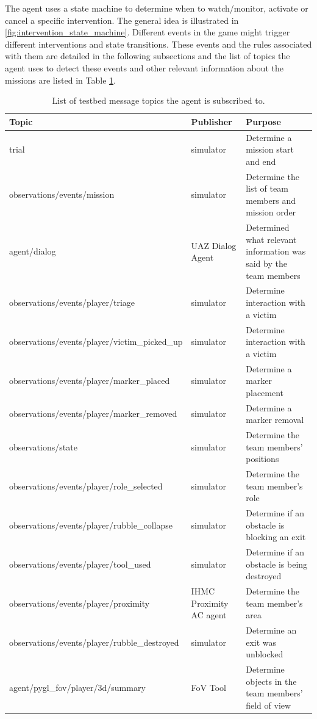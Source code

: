 The agent uses a state machine to determine when to watch/monitor, activate or cancel a specific intervention. The general idea is illustrated in \ref{fig:intervention_state_machine}. Different events in the game might trigger different interventions and state transitions. These events and the rules associated with them are detailed in the following subsections and the list of topics the agent uses to detect these events and other relevant information about the missions are listed in Table \ref{tab:intervention_variables}.

\begin{table}
    \small
    \centering
    \begin{tabularx}{6in}{lp{1.2in}X}
        \toprule
        Topic & Publisher & Purpose\\
        \midrule  
    	trial & simulator & Determine a mission start and end \\
    	observations/events/mission & simulator & Determine the list of team members and mission order \\    
    	agent/dialog & UAZ Dialog Agent & Determined what relevant information was said by the team members \\
    	observations/events/player/triage & simulator & Determine interaction with a victim \\    
    	observations/events/player/victim\_picked\_up & simulator & Determine interaction with a victim \\
    	observations/events/player/marker\_placed & simulator & Determine a marker placement \\
    	observations/events/player/marker\_removed & simulator & Determine a marker removal \\  
    	observations/state & simulator & Determine the team members' positions \\	
    	observations/events/player/role\_selected & simulator & Determine the team member's role \\
    	observations/events/player/rubble\_collapse & simulator & Determine if an obstacle is blocking an exit \\
    	observations/events/player/tool\_used & simulator & Determine if an obstacle is being destroyed \\
    	observations/events/player/proximity & IHMC Proximity AC agent & Determine the team member's area \\
    	observations/events/player/rubble\_destroyed & simulator & Determine an exit was unblocked \\   
    	agent/pygl\_fov/player/3d/summary & FoV Tool & Determine objects in the team members' field of view \\    	
        \bottomrule
    \end{tabularx}
    \caption{%
        List of testbed message topics the agent is subscribed to.
    }
    \label{tab:intervention_variables}
\end{table}

